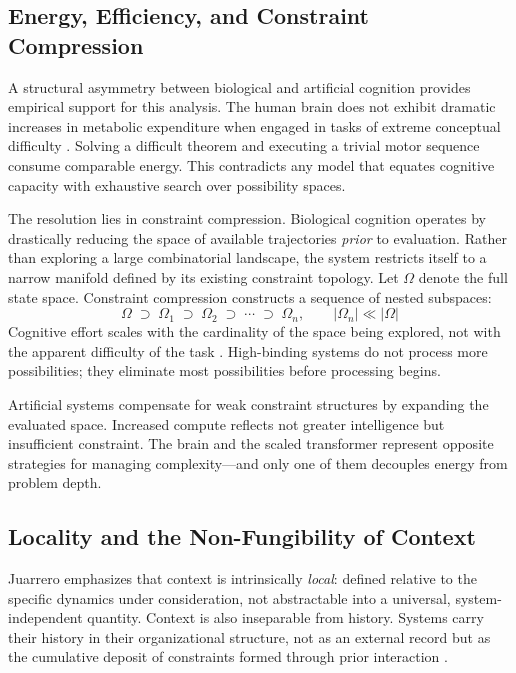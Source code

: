 \documentclass[11pt]{article}
\begin{document}
\subsection{Energy, Efficiency, and Constraint Compression}

A structural asymmetry between biological and artificial cognition provides empirical
support for this analysis. The human brain does not exhibit dramatic increases in metabolic
expenditure when engaged in tasks of extreme conceptual difficulty \citep{friston2010}.
Solving a difficult theorem and executing a trivial motor sequence consume comparable
energy. This contradicts any model that equates cognitive capacity with exhaustive search
over possibility spaces.

The resolution lies in constraint compression. Biological cognition operates by
drastically reducing the space of available trajectories \emph{prior} to evaluation.
Rather than exploring a large combinatorial landscape, the system restricts itself to a
narrow manifold defined by its existing constraint topology. Let $\Omega$ denote the
full state space. Constraint compression constructs a sequence of nested subspaces:
\[
\Omega \;\supset\; \Omega_1 \;\supset\; \Omega_2 \;\supset\; \cdots \;\supset\; \Omega_n, \qquad |\Omega_n| \ll |\Omega|
\]
Cognitive effort scales with the cardinality of the space being explored, not with the
apparent difficulty of the task \citep{kelso1995}. High-binding systems do not process
more possibilities; they eliminate most possibilities before processing begins.

Artificial systems compensate for weak constraint structures by expanding the evaluated
space. Increased compute reflects not greater intelligence but insufficient constraint.
The brain and the scaled transformer represent opposite strategies for managing
complexity—and only one of them decouples energy from problem depth.

\subsection{Locality and the Non-Fungibility of Context}

Juarrero emphasizes that context is intrinsically \emph{local}: defined relative to the
specific dynamics under consideration, not abstractable into a universal, system-independent
quantity. Context is also inseparable from history. Systems carry their history in their
organizational structure, not as an external record but as the cumulative deposit of
constraints formed through prior interaction \citep{thelen1994}.
\end{document}
